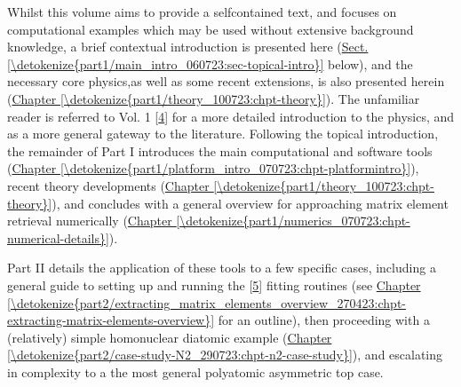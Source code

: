 \documentclass[letterpaper,table,10pt,english]{jupyterBook}
\begin{document}
\sphinxAtStartPar
Whilst this volume aims to provide a self\sphinxhyphen{}contained text, and focuses on computational examples which may be used without extensive background knowledge, a brief contextual introduction is presented here (\hyperref[\detokenize{part1/main_intro_060723:sec-topical-intro}]{Sect.\@ \ref{\detokenize{part1/main_intro_060723:sec-topical-intro}}} below), and the  necessary core physics,as well as some recent extensions, is also presented herein (\hyperref[\detokenize{part1/theory_100723:chpt-theory}]{Chapter \ref{\detokenize{part1/theory_100723:chpt-theory}}}). The unfamiliar reader is referred to  Vol. 1 {[}\hyperlink{cite.backmatter/bibliography:id675}{4}{]} for a more detailed introduction to the physics, and as a more general gateway to the literature. Following the topical introduction, the remainder of Part I introduces the main computational and software tools (\hyperref[\detokenize{part1/platform_intro_070723:chpt-platformintro}]{Chapter \ref{\detokenize{part1/platform_intro_070723:chpt-platformintro}}}), recent theory developments (\hyperref[\detokenize{part1/theory_100723:chpt-theory}]{Chapter \ref{\detokenize{part1/theory_100723:chpt-theory}}}), and concludes with a general overview for approaching matrix element retrieval numerically (\hyperref[\detokenize{part1/numerics_070723:chpt-numerical-details}]{Chapter \ref{\detokenize{part1/numerics_070723:chpt-numerical-details}}}).

\sphinxAtStartPar
Part II details the application of these tools to a few specific cases, including a general guide to setting up and running the  {[}\hyperlink{cite.backmatter/bibliography:id680}{5}{]} fitting routines (see \hyperref[\detokenize{part2/extracting_matrix_elements_overview_270423:chpt-extracting-matrix-elements-overview}]{Chapter \ref{\detokenize{part2/extracting_matrix_elements_overview_270423:chpt-extracting-matrix-elements-overview}}} for an outline), then proceeding with a (relatively) simple homonuclear diatomic example (\hyperref[\detokenize{part2/case-study-N2_290723:chpt-n2-case-study}]{Chapter \ref{\detokenize{part2/case-study-N2_290723:chpt-n2-case-study}}}), and escalating in complexity to a the most general polyatomic asymmetric top case.
\end{document}

